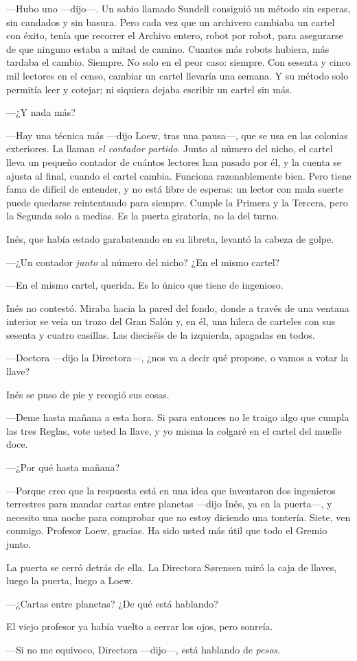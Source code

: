 ---Hubo uno ---dijo---\nobreak. Un sabio llamado Sundell consiguió un método sin esperas, sin candados y sin basura. Pero cada vez que un archivero cambiaba un cartel con éxito, tenía que recorrer el Archivo entero, robot por robot, para asegurarse de que ninguno estaba a mitad de camino. Cuantos más robots hubiera, más tardaba el cambio. Siempre. No solo en el peor caso: siempre. Con sesenta y cinco mil lectores en el censo, cambiar un cartel llevaría una semana. Y su método solo permitía leer y cotejar; ni siquiera dejaba escribir un cartel sin más.

---¿Y nada más?

---Hay una técnica más ---dijo Loew, tras una pausa---\nobreak, que se usa en las colonias exteriores. La llaman \emph{el contador partido}. Junto al número del nicho, el cartel lleva un pequeño contador de cuántos lectores han pasado por él, y la cuenta se ajusta al final, cuando el cartel cambia. Funciona razonablemente bien. Pero tiene fama de difícil de entender, y no está libre de esperas: un lector con mala suerte puede quedarse reintentando para siempre. Cumple la Primera y la Tercera, pero la Segunda solo a medias. Es la puerta giratoria, no la del turno.

Inés, que había estado garabateando en su libreta, levantó la cabeza de golpe.

---¿Un contador \emph{junto} al número del nicho? ¿En el mismo cartel?

---En el mismo cartel, querida. Es lo único que tiene de ingenioso.

Inés no contestó. Miraba hacia la pared del fondo, donde a través de una ventana interior se veía un trozo del Gran Salón y, en él, una hilera de carteles con sus sesenta y cuatro casillas. Las dieciséis de la izquierda, apagadas en todos.

---Doctora ---dijo la Directora---\nobreak, ¿nos va a decir qué propone, o vamos a votar la llave?

Inés se puso de pie y recogió sus cosas.

---Deme hasta mañana a esta hora. Si para entonces no le traigo algo que cumpla las tres Reglas, vote usted la llave, y yo misma la colgaré en el cartel del muelle doce.

---¿Por qué hasta mañana?

---Porque creo que la respuesta está en una idea que inventaron dos ingenieros terrestres para mandar cartas entre planetas ---dijo Inés, ya en la puerta---\nobreak, y necesito una noche para comprobar que no estoy diciendo una tontería. Siete, ven conmigo. Profesor Loew, gracias. Ha sido usted más útil que todo el Gremio junto.

La puerta se cerró detrás de ella. La Directora Sørensen miró la caja de llaves, luego la puerta, luego a Loew.

---¿Cartas entre planetas? ¿De qué está hablando?

El viejo profesor ya había vuelto a cerrar los ojos, pero sonreía.

---Si no me equivoco, Directora ---dijo---\nobreak, está hablando de \emph{pesos}.
